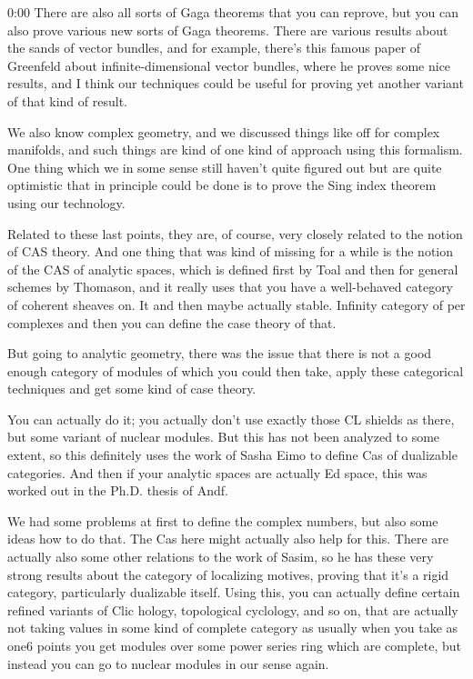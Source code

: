 \begin{unfinished}{0:00}
There are also all sorts of Gaga theorems that you can reprove, but you can also prove various new sorts of Gaga theorems. There are various results about the sands of vector bundles, and for example, there's this famous paper of Greenfeld about infinite-dimensional vector bundles, where he proves some nice results, and I think our techniques could be useful for proving yet another variant of that kind of result.

We also know complex geometry, and we discussed things like off for complex manifolds, and such things are kind of one kind of approach using this formalism. One thing which we in some sense still haven't quite figured out but are quite optimistic that in principle could be done is to prove the Sing index theorem using our technology.

Related to these last points, they are, of course, very closely related to the notion of CAS theory. And one thing that was kind of missing for a while is the notion of the CAS of analytic spaces, which is defined first by Toal and then for general schemes by Thomason, and it really uses that you have a well-behaved category of coherent sheaves on.
It and then maybe actually stable. Infinity category of per complexes and then you can define the case theory of that.

But going to analytic geometry, there was the issue that there is not a good enough category of modules of which you could then take, apply these categorical techniques and get some kind of case theory.

You can actually do it; you actually don't use exactly those CL shields as there, but some variant of nuclear modules. But this has not been analyzed to some extent, so this definitely uses the work of Sasha Eimo to define Cas of dualizable categories. And then if your analytic spaces are actually Ed space, this was worked out in the Ph.D. thesis of Andf.

We had some problems at first to define the complex numbers, but also some ideas how to do that. The Cas here might actually also help for this. There are actually also some other relations to the work of Sasim, so he has these very strong results about the category of localizing motives, proving that it's a rigid category, particularly dualizable itself. Using this, you can actually define certain refined variants of Clic hology, topological cyclology, and so on, that are actually not taking values in some kind of complete category as usually when you take as one6 points you get modules over some power series ring which are complete, but instead you can go to nuclear modules in our sense again.


\end{unfinished}
